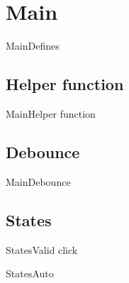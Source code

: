 \documentclass[aspectratio=169,10pt,t]{beamer}
\begin{document}
\section{Main}%
\label{sec:main}

\begin{frame}[t]{Main}{Defines}
	
\end{frame}

\subsection{Helper function}%
\label{sub:helper_function}


\begin{frame}[t]{Main}{Helper function}
	
\end{frame}

\subsection{Debounce}%
\label{sub:debounce}
\begin{frame}[t]{Main}{Debounce}
	
\end{frame}

\subsection{States}%
\label{sub:states}


\begin{frame}[t]{States}{Valid click}
	\only<1>{
	
	}
	\only<2>{
	
	}
\end{frame}

\begin{frame}[t]{States}{Auto}
	
\end{frame}
\end{document}
